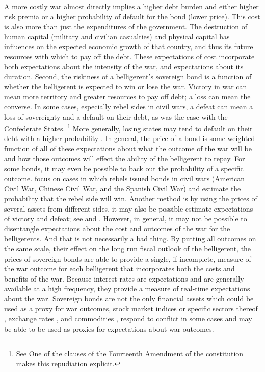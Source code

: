 A more costly war almost directly implies a higher debt burden and either higher risk premia or a higher probability of default for the bond (lower price).
This cost is also more than just the expenditures of the government.
The destruction of human capital (military and civilian casualties) and physical capital has influences on the expected economic growth of that country, and thus its future resources with which to pay off the debt.
These expectations of cost incorporate both expectations about the intensity of the war, and expectations about its duration.
Second, the riskiness of a belligerent's sovereign bond is a function of whether the belligerent is expected to win or lose the war.
Victory in war can mean more territory and greater resources to pay off debt; a loss can mean the converse.
In some cases, especially rebel sides in civil wars, a defeat can mean a loss of sovereignty and a default on their debt, as was the case with the Confederate States.%
\footnote{See One of the clauses of the Fourteenth Amendment of the constitution makes this repudiation explicit.}
More generally, losing states may tend to default on their debt with a higher probability \parencite{Slantchev2012a}.
In general, the price of a bond is some weighted function of all of these expectations about what the outcome of the war will be and how those outcomes will effect the ability of the belligerent to repay.
For some bonds, it may even be possible to back out the probability of a specific outcome.
\textcite{HaberMitchenerOosterlinckEtAl2015} focus on cases in which rebels issued bonds in civil wars (American Civil War, Chinese Civil War, and the Spanish Civil War) and estimate the probability that the rebel side will win.
Another method is by using the prices of several assets from different sides, it may also be possible estimate expectations of victory and defeat; see \textcite{Hall2004} and \textcite{McCandless1996}.
However, in general, it may not be possible to disentangle expectations about the cost and outcomes of the war for the belligerents.
And that is not necessarily a bad thing.
By putting all outcomes on the same scale, their effect on the long run fiscal outlook of the belligerent, the prices of sovereign bonds are able to provide a single, if incomplete, measure of the war outcome for each belligerent that incorporates both the costs and benefits of the war.
Because interest rates are expectations and are generally available at a high frequency, they provide a measure of real-time expectations about the war.
Sovereign bonds are not the only financial assets which could be used as a proxy for war outcomes, stock market indices or specific sectors thereof \textcites{ChenSiems2004}{SchneiderTroeger2006}{WolfersZitzewitz2009}, exchange rates \textcites{Hall2004}, and commodities \textcites{WolfersZitzewitz2009}, respond to conflict in some cases and may be able to be used as proxies for expectations about war outcomes.
